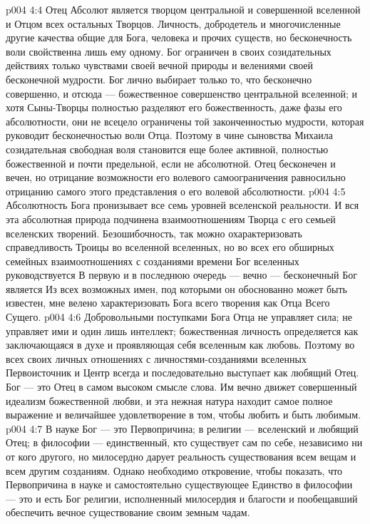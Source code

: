 \vs p004 4:4 Отец Абсолют является творцом центральной и совершенной вселенной и Отцом всех остальных Творцов. Личность, добродетель и многочисленные другие качества общие для Бога, человека и прочих существ, но бесконечность воли свойственна лишь ему одному. Бог ограничен в своих созидательных действиях только чувствами своей вечной природы и велениями своей бесконечной мудрости. Бог лично выбирает только то, что бесконечно совершенно, и отсюда --- божественное совершенство центральной вселенной; и хотя Сыны\hyp{}Творцы полностью разделяют его божественность, даже фазы его абсолютности, они не всецело ограничены той законченностью мудрости, которая руководит бесконечностью воли Отца. Поэтому в чине сыновства Михаила созидательная свободная воля становится еще более активной, полностью божественной и почти предельной, если не абсолютной. Отец бесконечен и вечен, но отрицание возможности его волевого самоограничения равносильно отрицанию самого этого представления о его волевой абсолютности.
\vs p004 4:5 \pc Абсолютность Бога пронизывает все семь уровней вселенской реальности. И вся эта абсолютная природа подчинена взаимоотношениям Творца с его семьей вселенских творений. Безошибочность, так можно охарактеризовать справедливость Троицы во вселенной вселенных, но во всех его обширных семейных взаимоотношениях с созданиями времени Бог вселенных руководствуется  В первую и в последнюю очередь --- вечно --- бесконечный Бог является  Из всех возможных имен, под которыми он обоснованно может быть известен, мне велено характеризовать Бога всего творения как Отца Всего Сущего.
\vs p004 4:6 Добровольными поступками Бога Отца не управляет сила; не управляет ими и один лишь интеллект; божественная личность определяется как заключающаяся в духе и проявляющая себя вселенным как любовь. Поэтому во всех своих личных отношениях с личностями\hyp{}созданиями вселенных Первоисточник и Центр всегда и последовательно выступает как любящий Отец. Бог --- это Отец в самом высоком смысле слова. Им вечно движет совершенный идеализм божественной любви, и эта нежная натура находит самое полное выражение и величайшее удовлетворение в том, чтобы любить и быть любимым.
\vs p004 4:7 \pc В науке Бог --- это Первопричина; в религии --- вселенский и любящий Отец; в философии --- единственный, кто существует сам по себе, независимо ни от кого другого, но милосердно дарует реальность существования всем вещам и всем другим созданиям. Однако необходимо откровение, чтобы показать, что Первопричина в науке и самостоятельно существующее Единство в философии --- это и есть Бог религии, исполненный милосердия и благости и пообещавший обеспечить вечное существование своим земным чадам.

